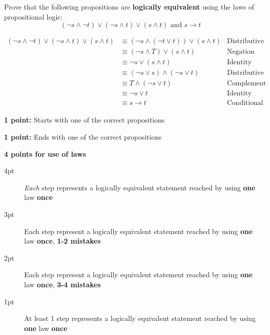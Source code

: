 \documentclass[homework, problems]{../../latex-common/cs151-common}
\begin{document}


\begin{enumeratequestions}
    \item Prove that the following propositions are \textbf{logically equivalent} using the laws of propositional logic:
    $$(\neg s \wedge \neg t) \vee (\neg s \wedge t) \vee (s \wedge t) \text{ and } s \rightarrow t$$

    \begin{solution}
    \begin{align*}
    (\neg s \wedge \neg t) \vee (\neg s \wedge t) \vee (s \wedge t) &\equiv (\neg s \land (\neg t \lor t)) \lor (s \land t) & \text{Distributive Law} \\
    &\equiv (\neg s \land T) \lor (s \wedge t) & \text{Negation Law} \\
    &\equiv \neg s \lor (s \land t) & \text{Identity Law} \\
    &\equiv (\neg s \lor s) \wedge (\neg s \lor t) & \text{Distributive Law} \\
    &\equiv T \land (\neg s \lor t) & \text{Complement Law} \\
    &\equiv \neg s \lor t & \text{Identity Law} \\
    &\equiv s \rightarrow t & \text{Conditional Identity}
    \end{align*}
    \end{solution}

    \begin{rubric}
        \textbf{1 point:} Starts with one of the correct propositions

        \textbf{1 point:} Ends with one of the correct propositions
        
        \textbf{4 points for use of laws}
        \begin{description}
            \item[4pt] \textit{Each} step represents a logically equivalent statement reached by using \textbf{one} law \textbf{once}
            \item[3pt] Each step represent a logically equivalent statement reached by using \textbf{one} law \textbf{once}, \textbf{1-2 mistakes}
            \item[2pt] Each step represent a logically equivalent statement reached by using \textbf{one} law \textbf{once}, \textbf{3-4 mistakes}
            \item[1pt] At least 1 step represents a logically equivalent statement reached by using \textbf{one} law \textbf{once}
        \end{description}


\end{rubric}
\end{enumeratequestions}
\end{document}
